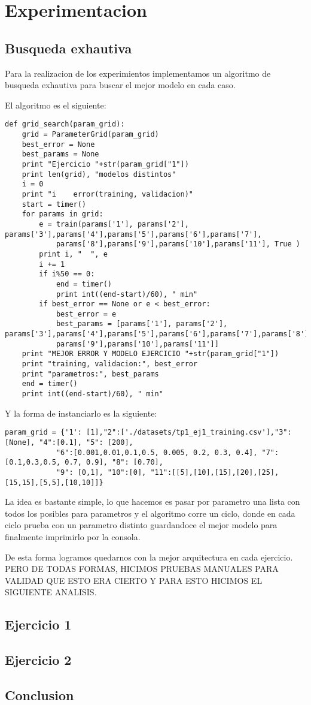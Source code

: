 \section{Experimentacion}
\subsection{Busqueda exhautiva}
Para la realizacion de los experimientos implementamos un algoritmo de busqueda exhautiva para buscar el mejor modelo en cada caso. 

El algoritmo es el siguiente:

\begin{lstlisting}[caption=grid\_search]
def grid_search(param_grid):
	grid = ParameterGrid(param_grid)
	best_error = None
	best_params = None
	print "Ejercicio "+str(param_grid["1"])
	print len(grid), "modelos distintos"
	i = 0
	print "i 	error(training, validacion)"
	start = timer()
	for params in grid:
	    e = train(params['1'], params['2'], params['3'],params['4'],params['5'],params['6'],params['7'],
	    	params['8'],params['9'],params['10'],params['11'], True )
	    print i, "	", e
	    i += 1
	    if i%50 == 0:
	    	end = timer()
	    	print int((end-start)/60), " min"
	    if best_error == None or e < best_error:
	    	best_error = e
	    	best_params = [params['1'], params['2'], params['3'],params['4'],params['5'],params['6'],params['7'],params['8'],
	    	params['9'],params['10'],params['11']]
	print "MEJOR ERROR Y MODELO EJERCICIO "+str(param_grid["1"])
	print "training, validacion:", best_error
	print "parametros:", best_params
	end = timer()
	print int((end-start)/60), " min"
\end{lstlisting}

Y la forma de instanciarlo es la siguiente:

\begin{lstlisting}[caption=Instanciacion]
param_grid = {'1': [1],"2":['./datasets/tp1_ej1_training.csv'],"3": [None], "4":[0.1], "5": [200], 
			"6":[0.001,0.01,0.1,0.5, 0.005, 0.2, 0.3, 0.4], "7":[0.1,0.3,0.5, 0.7, 0.9], "8": [0.70], 
			"9": [0,1], "10":[0], "11":[[5],[10],[15],[20],[25],[15,15],[5,5],[10,10]]}
\end{lstlisting}

La idea es bastante simple, lo que hacemos es pasar por parametro una lista con todos los posibles para parametros y el algoritmo corre un ciclo, donde en cada ciclo prueba con un parametro distinto guardandoce el mejor modelo para finalmente imprimirlo por la consola.

De esta forma logramos quedarnos con la mejor arquitectura en cada ejercicio. PERO DE TODAS FORMAS, HICIMOS PRUEBAS MANUALES PARA VALIDAD QUE ESTO ERA CIERTO Y PARA ESTO HICIMOS EL SIGUIENTE ANALISIS.
\subsection{Ejercicio 1}
\subsection{Ejercicio 2}
\subsection{Conclusion}
